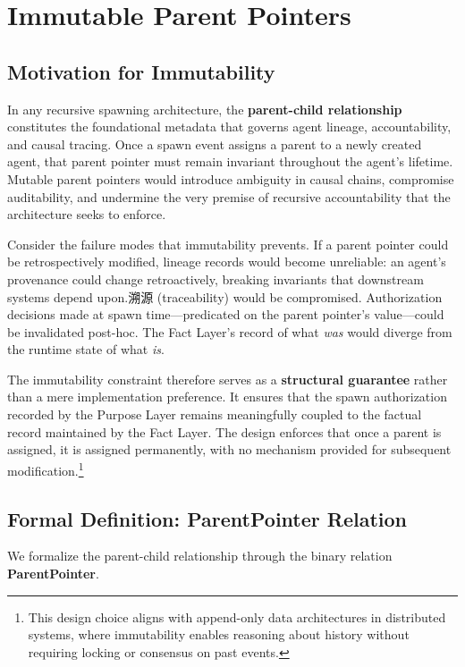 \section{Immutable Parent Pointers}

\subsection{Motivation for Immutability}

In any recursive spawning architecture, the \textbf{parent-child relationship} constitutes the foundational metadata that governs agent lineage, accountability, and causal tracing. Once a spawn event assigns a parent to a newly created agent, that parent pointer must remain invariant throughout the agent's lifetime. Mutable parent pointers would introduce ambiguity in causal chains, compromise auditability, and undermine the very premise of recursive accountability that the architecture seeks to enforce.

Consider the failure modes that immutability prevents. If a parent pointer could be retrospectively modified, lineage records would become unreliable: an agent's provenance could change retroactively, breaking invariants that downstream systems depend upon.溯源 (traceability) would be compromised. Authorization decisions made at spawn time—predicated on the parent pointer's value—could be invalidated post-hoc. The Fact Layer's record of what \emph{was} would diverge from the runtime state of what \emph{is}.

The immutability constraint therefore serves as a \textbf{structural guarantee} rather than a mere implementation preference. It ensures that the spawn authorization recorded by the Purpose Layer remains meaningfully coupled to the factual record maintained by the Fact Layer. The design enforces that once a parent is assigned, it is assigned permanently, with no mechanism provided for subsequent modification.\footnote{This design choice aligns with append-only data architectures in distributed systems, where immutability enables reasoning about history without requiring locking or consensus on past events.}

\subsection{Formal Definition: ParentPointer Relation}

We formalize the parent-child relationship through the binary relation \textbf{ParentPointer}.

